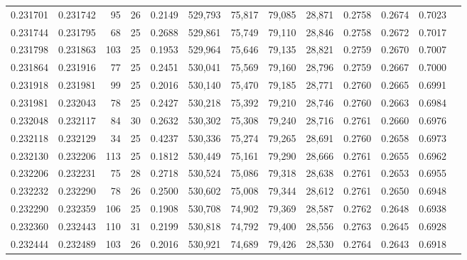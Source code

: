 \begin{tabular}{rrrrrrrrrrrrr}
0.231701 & 0.231742 &  95 &  26 &                                     0.2149 & 529,793 &  75,817 &  79,085 &  28,871 & 0.2758 & 0.2674 & 0.7023 \\
0.231744 & 0.231795 &  68 &  25 &                                     0.2688 & 529,861 &  75,749 &  79,110 &  28,846 & 0.2758 & 0.2672 & 0.7017 \\
0.231798 & 0.231863 & 103 &  25 &                                     0.1953 & 529,964 &  75,646 &  79,135 &  28,821 & 0.2759 & 0.2670 & 0.7007 \\
0.231864 & 0.231916 &  77 &  25 &                                     0.2451 & 530,041 &  75,569 &  79,160 &  28,796 & 0.2759 & 0.2667 & 0.7000 \\
0.231918 & 0.231981 &  99 &  25 &                                     0.2016 & 530,140 &  75,470 &  79,185 &  28,771 & 0.2760 & 0.2665 & 0.6991 \\
0.231981 & 0.232043 &  78 &  25 &                                     0.2427 & 530,218 &  75,392 &  79,210 &  28,746 & 0.2760 & 0.2663 & 0.6984 \\
0.232048 & 0.232117 &  84 &  30 &                                     0.2632 & 530,302 &  75,308 &  79,240 &  28,716 & 0.2761 & 0.2660 & 0.6976 \\
0.232118 & 0.232129 &  34 &  25 &                                     0.4237 & 530,336 &  75,274 &  79,265 &  28,691 & 0.2760 & 0.2658 & 0.6973 \\
0.232130 & 0.232206 & 113 &  25 &                                     0.1812 & 530,449 &  75,161 &  79,290 &  28,666 & 0.2761 & 0.2655 & 0.6962 \\
0.232206 & 0.232231 &  75 &  28 &                                     0.2718 & 530,524 &  75,086 &  79,318 &  28,638 & 0.2761 & 0.2653 & 0.6955 \\
0.232232 & 0.232290 &  78 &  26 &                                     0.2500 & 530,602 &  75,008 &  79,344 &  28,612 & 0.2761 & 0.2650 & 0.6948 \\
0.232290 & 0.232359 & 106 &  25 &                                     0.1908 & 530,708 &  74,902 &  79,369 &  28,587 & 0.2762 & 0.2648 & 0.6938 \\
0.232360 & 0.232443 & 110 &  31 &                                     0.2199 & 530,818 &  74,792 &  79,400 &  28,556 & 0.2763 & 0.2645 & 0.6928 \\
0.232444 & 0.232489 & 103 &  26 &                                     0.2016 & 530,921 &  74,689 &  79,426 &  28,530 & 0.2764 & 0.2643 & 0.6918 \\

\end{tabular}
